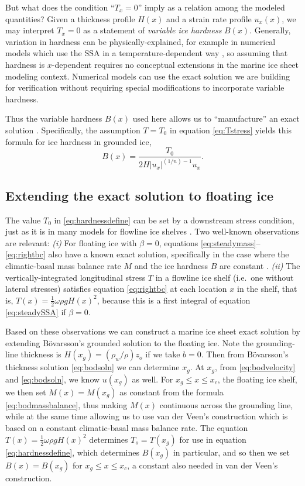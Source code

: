 \documentclass[twocolumn,letterpaper]{igs}
\renewcommand{\dh}{\fontencoding{T1}\selectfont{\symbol{240}}}
\newcommand{\bod}{B\"o\dh varsson\xspace}
\begin{document}
But what does the condition ``$T_x = 0$'' imply as a relation among the modeled quantities?  Given a thickness profile $H(x)$ and a strain rate profile $u_x(x)$, we may interpret $T_x = 0$ as a statement of \emph{variable ice hardness} $B(x)$.  Generally, variation in hardness can be physically-explained, for example in numerical models which use the SSA in a temperature-dependent way \citep{BBssasliding}, so assuming that hardness is $x$-dependent requires no conceptual extensions in the marine ice sheet modeling context.  Numerical models can use the exact solution we are building for verification without requiring special modifications to incorporate variable hardness.

Thus the variable hardness $B(x)$ used here allows us to ``manufacture'' an exact solution \citep{BLKCB}.  Specifically, the assumption $T=T_0$ in equation \eqref{eq:Tstress} yields this formula for ice hardness in grounded ice,
\begin{equation}
B(x) = \frac{T_0}{2 H |u_x|^{(1/n)-1} u_x}. \label{eq:hardnessdefine}
\end{equation}

\subsection*{Extending the exact solution to floating ice}  The value $T_0$ in \eqref{eq:hardnessdefine} can be set by a downstream stress condition, just as it is in many models for flowline ice shelves \citep[e.g.][]{MISMIP2012,SchoofMarine1}.  Two well-known observations are relevant:  \emph{(i)}  For floating ice with $\beta=0$, equations \eqref{eq:steadymass}--\eqref{eq:rightbc} also have a known exact solution, specifically in the case where the climatic-basal mass balance rate $M$ and the ice hardness $B$ are constant \citep{vanderVeen83,vanderVeen}.  \emph{(ii)}  The vertically-integrated longitudinal stress $T$ in a flowline ice shelf (i.e.~one without lateral stresses) satisfies equation \eqref{eq:rightbc} at each location $x$ in the shelf, that is, $T(x) = \frac{1}{2} \omega \rho g H(x)^2$, because this is a first integral of equation \eqref{eq:steadySSA} if $\beta=0$.

Based on these observations we can construct a marine ice sheet exact solution by extending \bod's grounded solution to the floating ice.  Note the grounding-line thickness is $H(x_g) = (\rho_w/\rho) z_o$ if we take $b=0$.  Then from \bod's thickness solution \eqref{eq:bodsoln} we can determine $x_g$.  At $x_g$, from \eqref{eq:bodvelocity} and \eqref{eq:bodsoln}, we know $u(x_g)$ as well.  For $x_g \le x \le x_c$, the floating ice shelf, we then set $M(x) = M(x_g)$ as constant from the formula \eqref{eq:bodmassbalance}, thus making $M(x)$ continuous across the grounding line, while at the same time allowing us to use van der Veen's construction which is based on a constant climatic-basal mass balance rate.  The equation $T(x) = \frac{1}{2} \omega \rho g H(x)^2$ determines $T_o=T(x_g)$ for use in equation \eqref{eq:hardnessdefine}, which determines $B(x_g)$ in particular, and so then we set $B(x)=B(x_g)$ for $x_g \le x \le x_c$, a constant also needed in van der Veen's construction.
\end{document}
